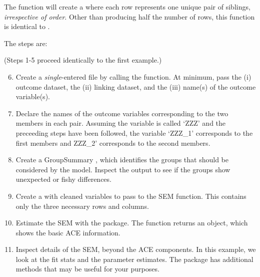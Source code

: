 \documentclass[letterpaper]{article}\usepackage{graphicx, color}
\begin{document}
The  function will create a  where each row represents one unique pair of siblings, \emph{irrespective of order}.  Other than producing half the number of rows, this function is identical to .

The steps are:

(Steps 1-5 proceed identically to the first example.)
\begin{enumerate}
\setcounter{enumi}{5}   
\item Create a \emph{single}-entered file by calling the  function.  At minimum, pass the (i) outcome dataset, the (ii) linking dataset, and the (iii) name(s) of the outcome variable(s). 
\item Declare the names of the outcome variables corresponding to the two members in each pair.  Assuming the variable is called `ZZZ' and the preceeding steps have been followed, the variable `ZZZ\_1' corresponds to the first members and ZZZ\_2' corresponds to the second members. 
\item Create a GroupSummary , which identifies the  groups that should be considered by the model.  Inspect the output to see if the groups show unexpected or fishy differences.
\item Create a  with cleaned variables to pass to the SEM function.  This  contains only the three necessary rows and columns.
\item Estimate the SEM with the  package.  The function returns an  object, which shows the basic ACE information.
\item Inspect details of the SEM, beyond the ACE components.  In this example, we look at the fit stats and the parameter estimates.  The  package has additional methods that may be useful for your purposes.
\end{enumerate}
\end{document}
